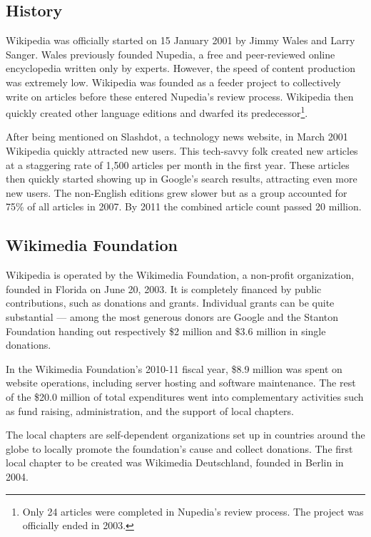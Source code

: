 \subsection{History}

Wikipedia was officially started on 15 January 2001 by Jimmy Wales and Larry Sanger.
Wales previously founded Nupedia, a free and peer-reviewed online encyclopedia written only by experts.
However, the speed of content production was extremely low.
Wikipedia was founded as a feeder project to collectively write on articles before these entered Nupedia's review process.
Wiki\-pedia then quickly created other language editions and dwarfed its predecessor\footnote{Only 24 articles were completed in Nupedia's review process. The project was officially ended in 2003.}.\cite{wphistory}

After being mentioned on Slashdot, a technology news website, in March 2001 Wikipedia quickly attracted new users.
This tech-savvy folk created new articles at a staggering rate of 1,500 articles per month in the first year.
These articles then quickly started showing up in Google's search results, attracting even more new users.
The non-English editions grew slower but as a group accounted for 75\% of all articles in 2007.
By 2011 the combined article count passed 20 million.\cite{wphistory}

\subsection{Wikimedia Foundation}\label{sub:wmf}

Wikipedia is operated by the Wikimedia Foundation, a non-profit organization, founded in Florida on June 20, 2003.
It is completely financed by public contributions, such as donations and grants.
Individual grants can be quite substantial --- among the most generous donors are Google and the Stanton Foundation handing out respectively \$2 million and \$3.6 million in single donations.\cite{wmf}

In the Wikimedia Foundation's 2010-11 fiscal year, \$8.9 million was spent on website operations, including server hosting and software maintenance.
The rest of the \$20.0 million of total expenditures went into complementary activities such as fund raising, administration, and the support of local chapters.\cite{wmf201011}

The local chapters are self-dependent organizations set up in countries around the globe to locally promote the foundation's cause and collect donations.
The first local chapter to be created was Wikimedia Deutschland, founded in Berlin in 2004.\cite{wmf}


